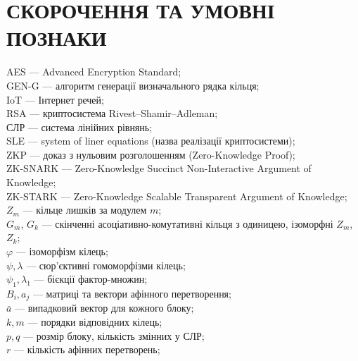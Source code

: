 \chapter*{СКОРОЧЕННЯ ТА УМОВНІ ПОЗНАКИ}
{}

\noindent
AES --- Advanced Encryption Standard; \\
GEN-G --- алгоритм генерації визначального рядка кільця; \\
IoT --- Інтернет речей; \\
RSA --- криптосистема Rivest–Shamir–Adleman; \\
СЛР --- система лінійних рівнянь; \\
SLE --- system of liner equations (назва реалізації криптосистеми); \\
ZKP --- доказ з нульовим розголошенням (Zero-Knowledge Proof); \\
ZK-SNARK --- Zero-Knowledge Succinct Non-Interactive Argument of Knowledge; \\
ZK-STARK --- Zero-Knowledge Scalable Transparent Argument of Knowledge; \\
$Z_m$ --- кільце лишків за модулем $m$; \\
$G_m$, $G_k$ --- скінченні асоціативно-комутативні кільця з одиницею, ізоморфні $Z_m$, $Z_k$; \\
$\varphi$ --- ізоморфізм кілець; \\
$\psi, \lambda$ --- сюр'єктивні гомоморфізми кілець; \\
$\psi_1, \lambda_1$ --- бієкції фактор-множин; \\
$B_i, a_j$ --- матриці та вектори афінного перетворення; \\
$\bar{a}$ --- випадковий вектор для кожного блоку; \\
$k, m$ --- порядки відповідних кілець; \\
$p, q$ --- розмір блоку, кількість змінних у СЛР; \\
$r$ --- кількість афінних перетворень; \\
